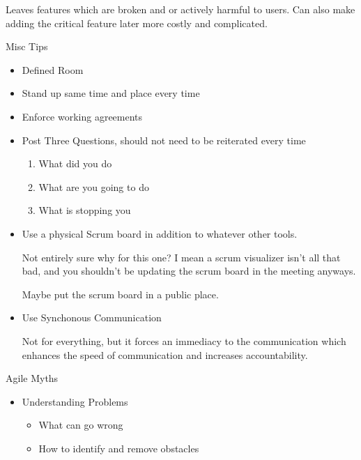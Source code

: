 \documentclass{report}
\begin{document}
\begin{description}
\begin{itemize}
                Leaves features which are broken and or
                actively harmful to users. Can also make
                adding the critical feature later more
                costly and complicated.
        \end{itemize}
    \item Misc Tips
        \begin{itemize}
            \item Defined Room
            \item Stand up same time and place every time
            \item Enforce working agreements
            \item Post Three Questions, should not need to be
                reiterated every time
                \begin{mdframed}
                    \begin{enumerate}
                        \item What did you do
                        \item What are you going to do
                        \item What is stopping you
                    \end{enumerate}
                \end{mdframed}
            \item Use a physical Scrum board in addition
                to whatever other tools.
                \begin{mdframed}
                    Not entirely sure why for this one? I
                    mean a scrum visualizer isn't all that
                    bad, and you shouldn't be updating the
                    scrum board in the meeting anyways.

                    Maybe put the scrum board in a public place.
                \end{mdframed}

            \item Use Synchonous Communication
                \begin{mdframed}
                    Not for everything, but it forces
                    an immediacy to the communication which
                    enhances the speed of communication and
                    increases accountability.
                \end{mdframed}
        \end{itemize}

    \item Agile Myths
        \begin{itemize}
            \item Understanding Problems
                \begin{itemize}
                    \item What can go wrong
                    \item How to identify and remove obstacles
                \end{itemize}
        \end{itemize}


\end{description}
\end{document}
